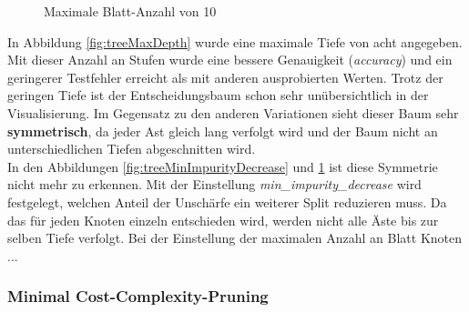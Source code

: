 \begin{figure}[H]
\begin{minipage}{0.30\textwidth}
        \caption{Maximale Blatt-Anzahl von 10}
        \label{fig:treeMaxLeafNodes}
    \end{minipage}
\end{figure}
\noindent \hspace*{7mm}
In Abbildung \ref{fig:treeMaxDepth} wurde eine maximale Tiefe von acht angegeben. Mit dieser Anzahl an Stufen wurde eine bessere Genauigkeit (\emph{accuracy}) und ein geringerer Testfehler erreicht als mit anderen ausprobierten Werten. Trotz der geringen Tiefe ist der Entscheidungsbaum schon sehr unübersichtlich in der Visualisierung. Im Gegensatz zu den anderen Variationen sieht dieser Baum sehr \textbf{symmetrisch}, da jeder Ast gleich lang verfolgt wird und der Baum nicht an unterschiedlichen Tiefen abgeschnitten wird.\\
\noindent \hspace*{7mm}
In den Abbildungen \ref{fig:treeMinImpurityDecrease} und \ref{fig:treeMaxLeafNodes} ist diese Symmetrie nicht mehr zu erkennen. Mit der Einstellung \emph{min\_impurity\_decrease} wird festgelegt, welchen Anteil der Unschärfe ein weiterer Split reduzieren muss. Da das für jeden Knoten einzeln entschieden wird, werden nicht alle Äste bis zur selben Tiefe verfolgt. Bei der Einstellung der maximalen Anzahl an Blatt Knoten ...
\subsubsection{Minimal Cost-Complexity-Pruning}





